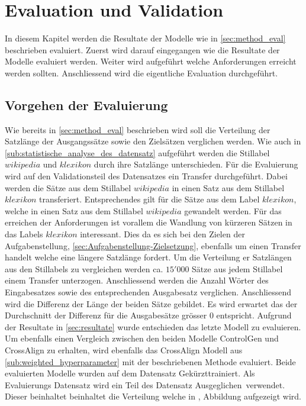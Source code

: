 \chapter{Evaluation und Validation}
\label{ch:Eval}

In diesem Kapitel werden die Resultate der Modelle wie in \ref{sec:method_eval} beschrieben evaluiert. Zuerst wird darauf
eingegangen wie die Resultate der Modelle evaluiert werden. Weiter wird aufgeführt welche Anforderungen erreicht werden
sollten. Anschliessend wird die eigentliche Evaluation durchgeführt.

\section{Vorgehen der Evaluierung}
\label{sec:vorgehen_evaluation}

Wie bereits in \ref{sec:method_eval} beschrieben wird soll die Verteilung der Satzlänge der Ausgangssätze sowie den
Zielsätzen verglichen werden. Wie auch in \ref{sub:statistische_analyse_des_datensatz} aufgeführt werden die Stillabel $
wikipedia $ und $ klexikon $ durch ihre Satzlänge unterschieden. Für die Evaluierung wird auf den Validationsteil des
Datensatzes ein Transfer durchgeführt. Dabei werden die Sätze aus dem Stillabel $ wikipedia $ in einen Satz aus dem
Stillabel $ klexikon $ transferiert. Entsprechendes gilt für die Sätze aus dem Label $ klexikon $, welche in einen Satz
aus dem Stillabel $ wikipedia $ gewandelt werden. Für das erreichen der Anforderungen ist vorallem die Wandlung
von kürzeren Sätzen in das Labels $ klexikon $ interessant. Dies da es sich bei den Zielen der Aufgabenstellung,
\ref{sec:Aufgabenstellung-Zielsetzung}, ebenfalls um einen Transfer handelt welche eine längere Satzlänge fordert.
\newline
\newline
Um die Verteilung er Satzlängen aus den Stillabels zu vergleichen werden ca. $ 15'000 $ Sätze aus jedem Stillabel einem
Transfer unterzogen. Anschliessend werden die Anzahl Wörter des Eingabesatzes sowie des entsprechenden Ausgabesatz
verglichen. Anschliessend wird die Differenz der Länge der beiden Sätze gebildet. Es wird erwartet das der Durchschnitt
der Differenz für die Ausgabesätze grösser $ 0 $ entspricht.
\newline
\newline
Aufgrund der Resultate in \ref{sec:resultate} wurde entschieden das letzte Modell
 zu evaluieren. Um ebenfalls einen Vergleich zwischen den beiden Modelle
ControlGen und CrossAlign zu erhalten, wird ebenfalls das CrossAlign Modell aus
\ref{sub:weighted_hyperparameter} mit der beschriebenen Methode evaluiert. Beide evaluierten Modelle wurden auf dem
Datensatz \flqq Gekürzt\frqq trainiert.
\newline
\newline
Als Evaluierungs Datensatz wird ein Teil des Datensatz \flqq Ausgeglichen\frqq \ verwendet. Dieser beinhaltet beinhaltet
die Verteilung welche in
, Abbildung 
aufgezeigt wird.

